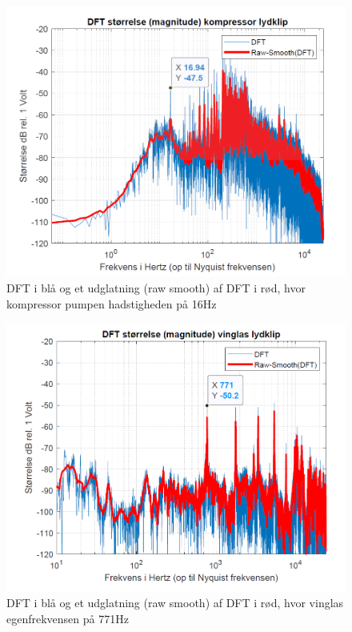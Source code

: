 \begin{figure}[H]
\centering
\includegraphics[width=\textwidth]{"figures/opgave6_kom_1.png"}
\caption{DFT i blå og et udglatning (raw smooth) af DFT i rød, hvor kompressor pumpen hadstigheden på 16Hz}
\label{fig:kompressor}
\end{figure}

\begin{figure}[H]
\centering
\includegraphics[width=\textwidth]{"figures/opgave6_vinglas_1.png"}
\caption{DFT i blå og et udglatning (raw smooth) af DFT i rød, hvor vinglas egenfrekvensen på 771Hz}
\label{fig:vinglas}
\end{figure}

